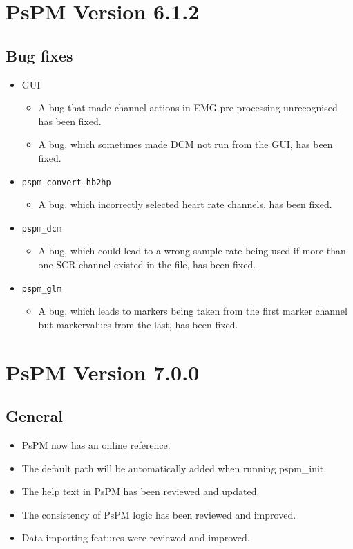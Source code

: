 \documentclass[english]{article}
\numberwithin{equation}{section}
\numberwithin{figure}{section}
\begin{document}
\section{PsPM Version 6.1.2}
\subsection*{Bug fixes}
\begin{itemize}
\item GUI
\begin{itemize}
\item A bug that made channel actions in EMG pre-processing unrecognised has been fixed.
\item A bug, which sometimes made DCM not run from the GUI, has been fixed.
\end{itemize}
\item \texttt{pspm\_convert\_hb2hp}
\begin{itemize}
\item A bug, which incorrectly selected heart rate channels, has been
fixed.
\end{itemize}
\item \texttt{pspm\_dcm}
\begin{itemize}
\item A bug, which could lead to a wrong sample rate being used if more than one SCR 
			channel existed in the file, has been fixed.
\end{itemize}
\item \texttt{pspm\_glm}
\begin{itemize}
\item A bug, which leads to markers being taken from the first marker
channel but markervalues from the last, has been fixed.
\end{itemize}
\end{itemize}

\section{PsPM Version 7.0.0}
\subsection*{General}
\begin{itemize}
\item PsPM now has an online reference.

\item The default path will be automatically added when running pspm\_init.

\item The help text in PsPM has been reviewed and updated.

\item The consistency of PsPM logic has been reviewed and improved.

\item Data importing features were reviewed and improved.
\end{itemize}
\end{document}
